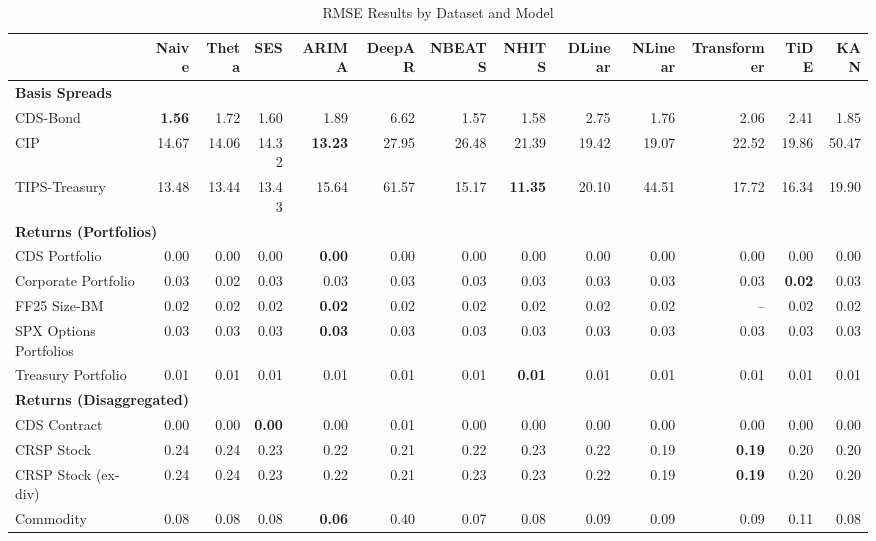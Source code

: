 
\begin{table}[htbp]
\centering
\caption{RMSE Results by Dataset and Model}
\label{tab:rmse_results}
\scriptsize
\setlength{\tabcolsep}{1.5pt}
\renewcommand{\arraystretch}{0.9}
\begin{tabular}{@{}lrrrrrrrrrrrr@{}}
\toprule
 & Naive & Theta & SES & ARIMA & DeepAR & NBEATS & NHITS & DLinear & NLinear & Transformer & TiDE & KAN \\
\midrule
\multicolumn{13}{l}{\textbf{Basis Spreads}} \\
CDS-Bond & \textbf{1.56} & 1.72 & 1.60 & 1.89 & 6.62 & 1.57 & 1.58 & 2.75 & 1.76 & 2.06 & 2.41 & 1.85 \\
CIP & 14.67 & 14.06 & 14.32 & \textbf{13.23} & 27.95 & 26.48 & 21.39 & 19.42 & 19.07 & 22.52 & 19.86 & 50.47 \\
TIPS-Treasury & 13.48 & 13.44 & 13.43 & 15.64 & 61.57 & 15.17 & \textbf{11.35} & 20.10 & 44.51 & 17.72 & 16.34 & 19.90 \\
\midrule
\multicolumn{13}{l}{\textbf{Returns (Portfolios)}} \\
CDS Portfolio & 0.00 & 0.00 & 0.00 & \textbf{0.00} & 0.00 & 0.00 & 0.00 & 0.00 & 0.00 & 0.00 & 0.00 & 0.00 \\
Corporate Portfolio & 0.03 & 0.02 & 0.03 & 0.03 & 0.03 & 0.03 & 0.03 & 0.03 & 0.03 & 0.03 & \textbf{0.02} & 0.03 \\
FF25 Size-BM & 0.02 & 0.02 & 0.02 & \textbf{0.02} & 0.02 & 0.02 & 0.02 & 0.02 & 0.02 & -- & 0.02 & 0.02 \\
SPX Options Portfolios & 0.03 & 0.03 & 0.03 & \textbf{0.03} & 0.03 & 0.03 & 0.03 & 0.03 & 0.03 & 0.03 & 0.03 & 0.03 \\
Treasury Portfolio & 0.01 & 0.01 & 0.01 & 0.01 & 0.01 & 0.01 & \textbf{0.01} & 0.01 & 0.01 & 0.01 & 0.01 & 0.01 \\
\midrule
\multicolumn{13}{l}{\textbf{Returns (Disaggregated)}} \\
CDS Contract & 0.00 & 0.00 & \textbf{0.00} & 0.00 & 0.01 & 0.00 & 0.00 & 0.00 & 0.00 & 0.00 & 0.00 & 0.00 \\
CRSP Stock & 0.24 & 0.24 & 0.23 & 0.22 & 0.21 & 0.22 & 0.23 & 0.22 & 0.19 & \textbf{0.19} & 0.20 & 0.20 \\
CRSP Stock (ex-div) & 0.24 & 0.24 & 0.23 & 0.22 & 0.21 & 0.23 & 0.23 & 0.22 & 0.19 & \textbf{0.19} & 0.20 & 0.20 \\
Commodity & 0.08 & 0.08 & 0.08 & \textbf{0.06} & 0.40 & 0.07 & 0.08 & 0.09 & 0.09 & 0.09 & 0.11 & 0.08 \\

\end{tabular}
\end{table}
